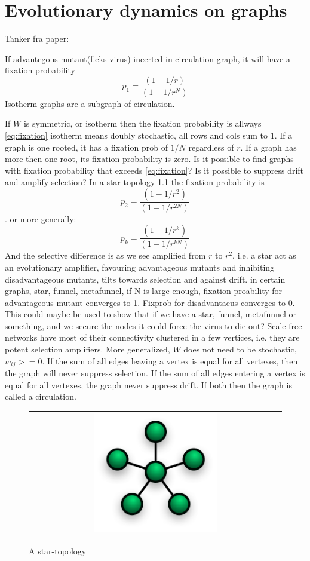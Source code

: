 \chapter{Evolutionary dynamics on graphs}
\label{chp:nature} 
\cite{lieberman2005evolutionary}
Tanker fra paper:

If advantegous mutant(f.eks virus) incerted in circulation graph, it will have a fixation probability 
\begin{equation}  p_{1}=\frac{(1-1/r)}{(1-1/r^{N})} \label{eq:fixation} \end{equation}
Isotherm graphs are a subgraph of circulation. 

If $W$ is symmetric, or isotherm then the fixation probability is allways \ref{eq:fixation}
isotherm means doubly stochastic, all rows and cols sum to 1. 
If a graph is one rooted, it has a fixation prob of $1/N$ regardless of $r$. If a graph has more then one root, its fixation probability is zero. 
Is it possible to find graphs with fixation probability that exceeds \ref{eq:fixation}? Is it possible to suppress drift and amplify selection?
In a star-topology \ref{fig:star} the fixation probability is\begin{equation}p_{2}=\frac{(1-1/r^{2})}{(1-1/r^{2N})} \label{eq:fixation2} \end{equation}.
or more generally: \begin{equation}
p_{k}=\frac{(1-1/r^{k})}{(1-1/r^{kN})} \label{eq:fixationk}
\end{equation}
And the selective difference is as we see amplified from $r$ to $r^{2}$. i.e. a star act as an evolutionary amplifier,
 favouring advantageous mutants and inhibiting disadvantageous mutants, tilts towards selection and against drift.
 in certain graphs, star, funnel, metafunnel, if N is large enough, fixation proability for advantageous mutant converges to 1. Fixprob for disadvantaeus converges to 0.
This could maybe be used to show that if we have a star, funnel, metafunnel or something, and we secure the nodes it could force the virus to die out?
Scale-free networks have most of their connectivity clustered in a few vertices, i.e. they are potent selection amplifiers.
More generalized, $W$ does not need to be stochastic, $w_{ij}>=0$. 
If the sum of all edges leaving a vertex is equal for all vertexes, then the graph will never suppress selection.
If the sum of all edges entering a vertex is equal for all vertexes, the graph never suppress drift.
If both then the graph is called a circulation.
 

\begin{figure}
\centering
\begin{tabular}{@{}c@{}}
\includegraphics[width=0.5\textwidth]{NetworkTopology-Star.png}
\end{tabular}
\caption{\label{fig:star} A star-topology}
\end{figure}



